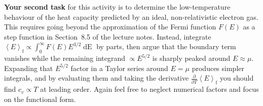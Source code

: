 \documentclass[12 pt]{article} %
\newcommand{\vev}[1]{\ensuremath{\left\langle #1 \right\rangle} }
\newcommand{\pderiv}[2]{\ensuremath{\frac{\partial #1}{\partial #2}} }
\begin{document}
\textbf{Your second task} for this activity is to determine the low-temperature behaviour of the heat capacity predicted by an ideal, non-relativistic electron gas.
This requires going beyond the approximation of the Fermi function $F(E)$ as a step function in Section~8.5 of the lecture notes.
Instead, integrate $\vev{E}_{\text{f}} \propto \int_0^{\infty} F(E) E^{3 / 2} \mathop{dE}$ by parts, then argue that the boundary term vanishes while the remaining integrand $\propto E^{5 / 2}$ is sharply peaked around $E \approx \mu$.
Expanding that $E^{5 / 2}$ factor in a Taylor series around $E = \mu$ produces simpler integrals, and by evaluating them and taking the derivative $\pderiv{}{T}\vev{E}_{\text{f}}$ you should find $c_v \propto T$ at leading order.
Again feel free to neglect numerical factors and focus on the functional form.
\end{document}
